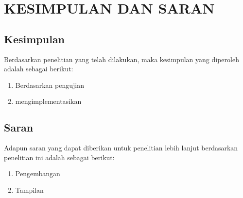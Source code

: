 \newpage
\chapter{KESIMPULAN DAN SARAN} \label{Bab V}

\section{Kesimpulan} \label{V.Kesimpulan}
Berdasarkan penelitian yang telah dilakukan, maka kesimpulan yang diperoleh adalah sebagai berikut:
\begin{enumerate}
    \item Berdasarkan pengujian 
    \item mengimplementasikan
\end{enumerate}

\section{Saran} \label{V.Saran}
Adapun saran yang dapat diberikan untuk penelitian lebih lanjut berdasarkan penelitian ini adalah sebagai berikut:\par
\begin{enumerate}
    \item Pengembangan 
    \item Tampilan 
\end{enumerate}